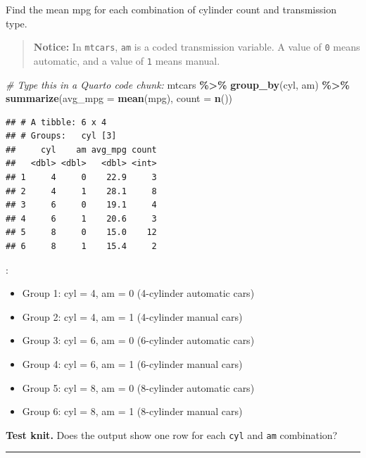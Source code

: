 \documentclass[
]{article}
\newenvironment{Shaded}{\begin{snugshade}}{\end{snugshade}}
\newcommand{\AttributeTok}[1]{\textcolor[rgb]{0.13,0.29,0.53}{#1}}
\newcommand{\CommentTok}[1]{\textcolor[rgb]{0.56,0.35,0.01}{\textit{#1}}}
\newcommand{\FunctionTok}[1]{\textcolor[rgb]{0.13,0.29,0.53}{\textbf{#1}}}
\newcommand{\NormalTok}[1]{#1}
\newcommand{\SpecialCharTok}[1]{\textcolor[rgb]{0.81,0.36,0.00}{\textbf{#1}}}
\begin{document}
Find the mean mpg for each combination of cylinder count and
transmission type.

\begin{quote}
\textbf{Notice:} In \texttt{mtcars}, \texttt{am} is a coded transmission
variable. A value of \texttt{0} means automatic, and a value of
\texttt{1} means manual.
\end{quote}

\begin{Shaded}
\begin{Highlighting}[]
\CommentTok{\#  Type this in a Quarto code chunk:}
\NormalTok{mtcars }\SpecialCharTok{\%\textgreater{}\%}
  \FunctionTok{group\_by}\NormalTok{(cyl, am) }\SpecialCharTok{\%\textgreater{}\%}
  \FunctionTok{summarize}\NormalTok{(}\AttributeTok{avg\_mpg =} \FunctionTok{mean}\NormalTok{(mpg),}
            \AttributeTok{count =} \FunctionTok{n}\NormalTok{())}
\end{Highlighting}
\end{Shaded}

\begin{verbatim}
## # A tibble: 6 x 4
## # Groups:   cyl [3]
##     cyl    am avg_mpg count
##   <dbl> <dbl>   <dbl> <int>
## 1     4     0    22.9     3
## 2     4     1    28.1     8
## 3     6     0    19.1     4
## 4     6     1    20.6     3
## 5     8     0    15.0    12
## 6     8     1    15.4     2
\end{verbatim}

:

\begin{itemize}
\item
  Group 1: cyl = 4, am = 0 (4-cylinder automatic cars)
\item
  Group 2: cyl = 4, am = 1 (4-cylinder manual cars)
\item
  Group 3: cyl = 6, am = 0 (6-cylinder automatic cars)
\item
  Group 4: cyl = 6, am = 1 (6-cylinder manual cars)
\item
  Group 5: cyl = 8, am = 0 (8-cylinder automatic cars)
\item
  Group 6: cyl = 8, am = 1 (8-cylinder manual cars)
\end{itemize}

\textbf{Test knit.} Does the output show one row for each \texttt{cyl}
and \texttt{am} combination?

\begin{center}\rule{0.5\linewidth}{0.5pt}\end{center}
\end{document}
